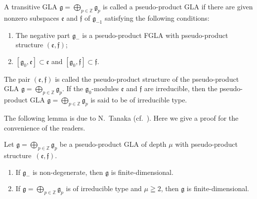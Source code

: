 \documentclass[pdftex]{sigma}
\numberwithin{equation}{section}
\numberwithin{theorem}{section}
\numberwithin{proposition}{section}
\numberwithin{lemma}{section}
\numberwithin{corollary}{section}
\numberwithin{definition}{section}
\numberwithin{example}{section}
\numberwithin{remark}{section}
\numberwithin{note}{section}
\newcommand{\gla}[1]{\mathfrak#1=\bigoplus\limits_{p\in\mathbb Z}\mathfrak#1_p} \renewcommand{\labelenumi}{{\rm (\arabic{enumi})}}
\begin{document}
A transitive GLA $\gla g$ is called a pseudo-product GLA
if there are given nonzero subspaces $\mathfrak e$ and $\mathfrak f$ of $\mathfrak g_{-1}$ satisfying the following conditions:
\begin{enumerate}\itemsep=0pt
\renewcommand{\labelenumi}{$(\roman{enumi})$}
\item The negative part $\mathfrak g_{-}$ is
a pseudo-product
FGLA with pseudo-product structure
$(\mathfrak e,\mathfrak f)$;
\item $[\mathfrak g_0,\mathfrak e]\subset \mathfrak e$
and $[\mathfrak g_0,\mathfrak f]\subset \mathfrak f$.
\end{enumerate}
The pair $(\mathfrak e,\mathfrak f)$ is called the pseudo-product structure of
 the pseudo-product GLA
$\gla g$.
If the $\mathfrak g_0$-modules $\mathfrak e$ and $\mathfrak f$ are
irreducible,
then the pseudo-product GLA $\gla g$ is said to be
of irreducible type.

The following lemma is due to N.~Tanaka (cf.~\cite{tan89:01}).
Here we give a proof for the convenience of the readers.
\begin{lemma}\label{lemma8.1} Let $\gla g$ be a pseudo-product GLA of
depth $\mu$ with pseudo-product structure~$(\mathfrak e,\mathfrak f)$.
\begin{enumerate}\itemsep=0pt
\item If $\mathfrak g_-$ is non-degenerate,
then $\mathfrak g$ is finite-dimensional.
\item If $\gla g$ is of irreducible type and $\mu\geqq2$, then
$\mathfrak g$ is finite-dimensional.
\end{enumerate}
\end{lemma}
\end{document}
